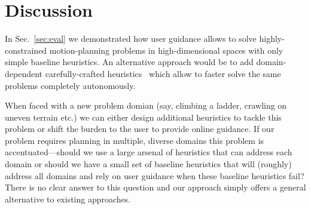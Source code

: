 \documentclass{article}
\begin{document}
\section{Discussion}
\label{sec:future}

In Sec.~\ref{sec:eval} we demonstrated how user guidance allows to solve highly-constrained motion-planning problems in high-dimensional spaces with only simple baseline heuristics.
An alternative approach would be to add domain-dependent carefully-crafted heuristics~\cite{V17} which allow to faster solve the same problems completely autonomously.

When faced with a new problem domian 
(say, climbing a ladder, crawling on uneven terrain etc.)
we can either design additional heuristics to tackle this problem or shift the burden to the user to provide online  guidance.
If our problem requires planning in multiple, diverse domains this problem is accentuated---should we  use a large arsenal of heuristics that can address each domain or should we have a small set of baseline heuristics that will (roughly) address all domains and rely on user guidance when these baseline heuristics fail?
There is no clear answer to this question and our approach simply offers a general alternative to existing approaches.


%


\newpage

%

%

\end{document}
